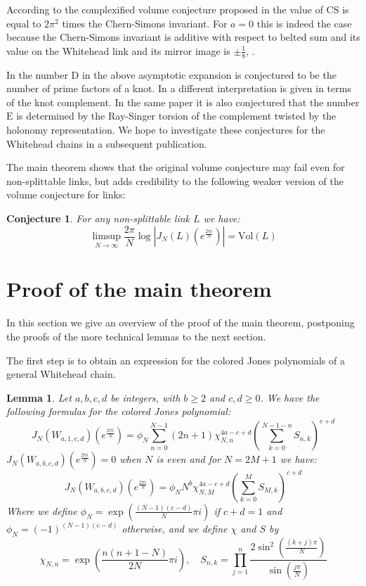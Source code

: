 \documentclass[letterpaper]{article}
\newtheorem{lem}{Lemma}
\newtheorem{conj}{Conjecture}
\begin{document}
According to the complexified volume conjecture proposed in \cite{MMOTY} the value of $\mathrm{CS}$ is equal to $2\pi^2$ times the
Chern-Simons invariant. For $a = 0$ this is indeed the case because the Chern-Simons invariant is additive with respect to belted sum and its value on the Whitehead link and its mirror image is $\pm\frac{1}{8}$, \cite{Ouyang}.

In \cite{Hikami} the number $\mathrm{D}$ in the above asymptotic
expansion is conjectured to be the number of prime factors of a
knot. In \cite{GM} a different interpretation is given in terms of
the knot complement. In the same paper it is also conjectured that
the number $\mathrm{E}$ is determined by the Ray-Singer torsion of
the complement twisted by the holonomy representation. We hope to
investigate these conjectures for the Whitehead chains in a
subsequent publication.

The main theorem shows that the original volume conjecture may fail even
for non-splittable links, but adds credibility to the following
weaker version of the volume conjecture for links:

\begin{conj}
For any non-splittable link $L$ we have: $$\limsup_{N\to\infty}\frac{2\pi}{N}\log|J_N(L)(e^{\frac{2\pi i}{N}})| = \mathrm{Vol}(L)$$
\end{conj}




\section{Proof of the main theorem} In this section we give an
overview of the proof of the main theorem, postponing the proofs of
the more technical lemmas to the next section.

The first step is to obtain an expression for the colored Jones
polynomials of a general Whitehead chain.

\begin{lem} Let $a,b,c,d$ be integers, with $b \geq 2$ and $c,d \geq 0$. We have the following formulas for the colored Jones polynomial:
$$J_N(W_{a,1,c,d})(e^{\frac{2\pi i}{N}}) =  \phi_N\sum_{n=0}^{N-1}(2n+1)\chi_{N,n}^{4a-c+d}\left(\sum_{k=0}^{N-1-n} S_{n,k}\right)^{c+d}$$
$J_{N}(W_{a,b,c,d})(e^{\frac{2\pi i}{N}})=0$ when $N$ is even and for $N=2M+1$ we have:
$$J_{N}(W_{a,b,c,d})(e^{\frac{2\pi i}{N}}) =  \phi_N N^{b}\chi_{N,M}^{4a-c+d}\left(\sum_{k=0}^{M} S_{M,k}\right)^{c+d}$$
\noindent Where we define $\phi_N =
\exp\left(\frac{(N-1)(c-d)}{N}\pi i\right)$ if $c+d = 1$ and
$\phi_N = (-1)^{(N-1)(c-d)}$ otherwise, and we define $\chi$ and
$S$ by
$$\chi_{N,n}=\exp\left(\frac{n(n+1-N)}{2N}\pi i\right), \quad
S_{n,k} =
\prod_{j=1}^n\frac{2\sin^2(\frac{(k+j)\pi}{N})}{\sin(\frac{j\pi}{N})}$$
\end{lem}
\end{document}
